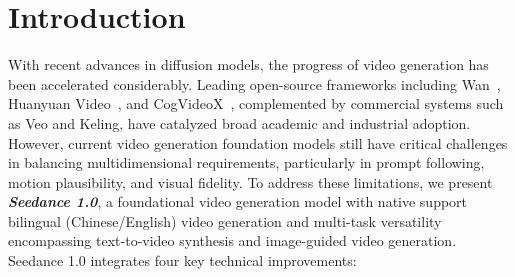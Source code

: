 

\section{Introduction}


With recent advances in diffusion models, the progress of video generation has been accelerated considerably. Leading open-source frameworks including Wan~\citep{wan2025wan}, Huanyuan Video~\citep{kong2024hunyuanvideo}, and CogVideoX~\citep{yang2024cogvideox}, complemented by commercial systems such as Veo and Keling, have catalyzed broad academic and industrial adoption. However, current video generation foundation models still have critical challenges in balancing multidimensional requirements, particularly in prompt following, motion plausibility, and visual fidelity.
To address these limitations, we present \textit{\textbf{Seedance 1.0}}, a foundational video generation model with native support bilingual (Chinese/English) video generation and multi-task versatility encompassing text-to-video synthesis and image-guided video generation. Seedance 1.0 integrates four key technical improvements:

